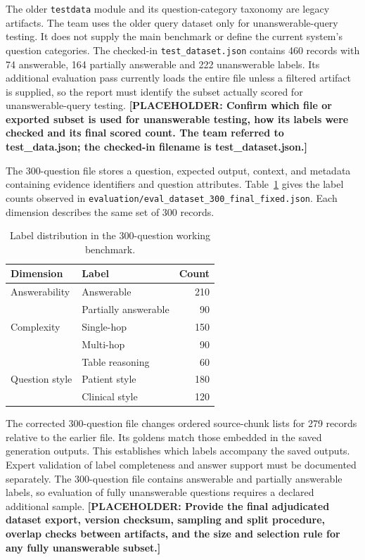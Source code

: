 \documentclass[oneside]{sn-jnl}
\newcommand{\pending}[1]{\textbf{\textcolor{red!65!black}{[PLACEHOLDER: #1]}}}
\newcommand{\artifact}[1]{\nolinkurl{#1}}
\begin{document}
The older \artifact{testdata} module and its question-category taxonomy are legacy artifacts. The team uses the older query dataset only for unanswerable-query testing. It does not supply the main benchmark or define the current system's question categories. The checked-in \artifact{test_dataset.json} contains 460 records with 74 answerable, 164 partially answerable and 222 unanswerable labels. Its additional evaluation pass currently loads the entire file unless a filtered artifact is supplied, so the report must identify the subset actually scored for unanswerable-query testing. \pending{Confirm which file or exported subset is used for unanswerable testing, how its labels were checked and its final scored count. The team referred to test\_data.json; the checked-in filename is test\_dataset.json.}

The 300-question file stores a question, expected output, context, and metadata containing evidence identifiers and question attributes. Table~\ref{tab:dataset} gives the label counts observed in \artifact{evaluation/eval_dataset_300_final_fixed.json}. Each dimension describes the same set of 300 records.

\begin{table}[htbp]
\centering
\caption{Label distribution in the 300-question working benchmark.}
\label{tab:dataset}
\begin{tabular}{llr}
\toprule
Dimension & Label & Count\\
\midrule
Answerability & Answerable & 210\\
 & Partially answerable & 90\\
Complexity & Single-hop & 150\\
 & Multi-hop & 90\\
 & Table reasoning & 60\\
Question style & Patient style & 180\\
 & Clinical style & 120\\
\bottomrule
\end{tabular}
\end{table}

The corrected 300-question file changes ordered source-chunk lists for 279 records relative to the earlier file. Its goldens match those embedded in the saved generation outputs. This establishes which labels accompany the saved outputs. Expert validation of label completeness and answer support must be documented separately. The 300-question file contains answerable and partially answerable labels, so evaluation of fully unanswerable questions requires a declared additional sample.
\pending{Provide the final adjudicated dataset export, version checksum, sampling and split procedure, overlap checks between artifacts, and the size and selection rule for any fully unanswerable subset.}
\end{document}
